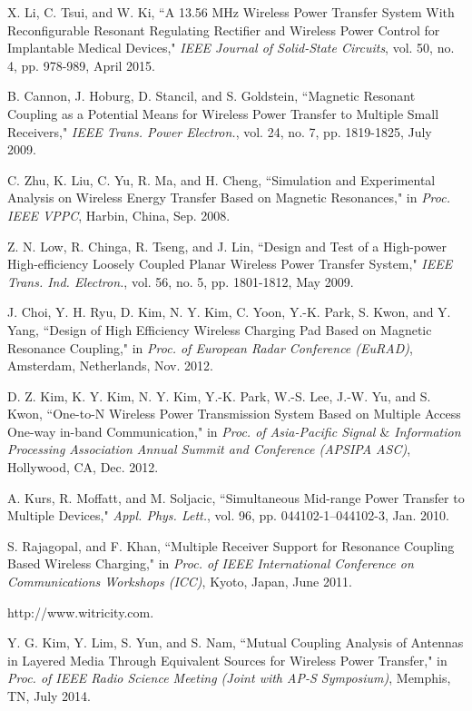 \documentclass[twocolumn,10pt]{IEEEtran}
\begin{document}
\begin{thebibliography}{99}
X. Li, C. Tsui, and W. Ki, ``A 13.56 MHz Wireless Power Transfer System With Reconfigurable Resonant Regulating Rectifier and Wireless Power Control for Implantable Medical Devices," 
\emph{IEEE Journal of Solid-State Circuits}, 
vol. 50, no. 4,  pp. 978-989, April  2015. 

B. Cannon, J. Hoburg, D. Stancil, and S. Goldstein, ``Magnetic Resonant
Coupling as a Potential Means for Wireless Power Transfer to Multiple Small Receivers," \emph{IEEE Trans. Power Electron.}, vol. 24, no. 7, pp. 1819-1825, July 2009.


C. Zhu, K. Liu, C. Yu, R. Ma, and H. Cheng, ``Simulation and Experimental Analysis on Wireless Energy Transfer Based on Magnetic Resonances," in \emph{Proc. IEEE VPPC}, Harbin, China, Sep. 2008.


Z. N. Low, R. Chinga, R. Tseng, and J. Lin, ``Design and Test of a
High-power High-efficiency Loosely Coupled Planar Wireless Power Transfer System," \emph{IEEE Trans. Ind. Electron.}, vol. 56, no. 5, pp. 1801-1812, May 2009.

J. Choi, Y. H. Ryu, D. Kim, N. Y. Kim, C. Yoon, Y.-K. Park, S. Kwon, and Y. Yang, ``Design of High Efficiency Wireless Charging Pad Based on Magnetic Resonance Coupling," in \emph{Proc. of European Radar Conference (EuRAD)}, Amsterdam, Netherlands, Nov. 2012.

D. Z. Kim, K. Y. Kim, N. Y. Kim, Y.-K. Park, W.-S. Lee, J.-W. Yu, and S. Kwon, ``One-to-N Wireless Power Transmission System Based on Multiple Access One-way in-band Communication," in \emph{Proc. of Asia-Pacific Signal $\&$ Information Processing Association Annual Summit and Conference (APSIPA ASC)}, Hollywood, CA, Dec. 2012.

A. Kurs, R. Moffatt, and M. Soljacic, ``Simultaneous Mid-range Power Transfer to Multiple Devices," \emph{Appl. Phys. Lett.}, vol. 96, pp. 044102-1–044102-3, Jan. 2010.
 

 S. Rajagopal, and F. Khan, ``Multiple Receiver Support for Resonance Coupling Based Wireless Charging," in \emph{Proc. of  IEEE International Conference on Communications Workshops (ICC)}, Kyoto, Japan, June 2011.

http://www.witricity.com.

Y. G. Kim, Y. Lim, S. Yun, and S. Nam, ``Mutual Coupling Analysis of Antennas in Layered Media Through Equivalent Sources for Wireless Power Transfer," 
in \emph{Proc. of IEEE Radio Science Meeting (Joint with AP-S Symposium)}, Memphis, TN, July 2014.


\end{thebibliography}
\end{document}
